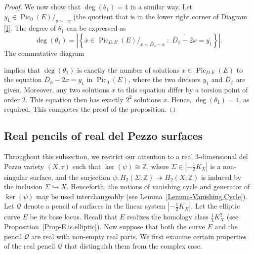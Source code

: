 \documentclass[11pt]{amsart}
\numberwithin{equation}{section}
\theoremstyle{definition}
\theoremstyle{plain}
\theoremstyle{remark}
\newcommand{\Z}{\mathbb{Z}}
\DeclareMathOperator{\Pic}{Pic}
\begin{document}
\begin{proof}
We now show that  $\deg (\theta_1)= 4$ in a similar way. Let $\overline{y_1} \in \Pic_{0} (E)/_{y\sim -y}$ (the quotient that is in the lower right corner of Diagram \eqref{I}. The degree of $\theta_1$ can be expressed as
$$\deg(\theta_1)=\left|\left\{\overline{x}\in \Pic_{D.E} (E)/_{x\sim \overline{D}_{\phi} -x} \; : \; \overline{ \overline{D}_{\phi}-2x}=\overline{ y_1}\right\}\right|.$$
The commutative diagram
\begin{center}
\end{center}
implies that $\deg(\theta_1)$ is exactly the number of solutions $x\in \Pic_{D.E}(E)$ to the equation $\overline{D}_{\phi}-2x=y_1$ in $\Pic_0(E)$, where the two divisors $y_1$ and $\overline{D}_{\phi}$ are given. Moreover, any two solutions $x$ to this equation differ by a torsion point of order $2$. This equation then has exactly $2^2$ solutions $x$.  Hence, $\deg(\theta_1)=4$, as required.
This completes the proof of the proposition.
\end{proof}

\subsection{Real pencils of real del Pezzo surfaces}
Throughout this subsection,  we restrict our attention to a real $3$-dimensional del Pezzo variety $(X,\tau)$  such that $\ker(\psi) \cong \Z$, where $\Sigma \in |-\frac{1}{2}K_X|$ is a non-singular surface, and the surjection $\psi\colon  H_2(\Sigma;\mathbb{Z})	\twoheadrightarrow H_2(X;\mathbb{Z})$ is induced by the inclusion $\Sigma\hookrightarrow X$. Henceforth, the notions of vanishing cycle and generator of $\ker (\psi)$ may be used interchangeably (see Lemma~\ref{Lemma-Vanishing.Cycle}). Let $\mathcal{Q}$ denote a pencil of surfaces in the linear system $|-\frac{1}{2}K_X|$. Let the elliptic curve $E$ be its base locus. Recall that $E$ realizes the homology class $\frac{1}{4}K_X^2$ (see Proposition~\ref{Prop-E.is.elliptic}). Now suppose  that both the curve $E$ and the pencil $\mathcal{Q}$ are real with non-empty real parts. We first examine certain properties of the real pencil $\mathcal{Q}$ that distinguish them from the complex case.
\end{document}
